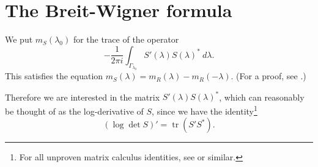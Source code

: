 \documentclass[12pt]{report}
\newcommand{\tr}{\operatorname{tr}}
\theoremstyle{definition}
\begin{document}
\section{The Breit-Wigner formula}
\label{BW section}
We put $m_S(\lambda_0)$ for the trace of the operator
$$-\frac{1}{2\pi i} \int_{\Gamma_{\lambda_0}} S'(\lambda)S(\lambda)^* ~d\lambda.$$
This satisfies the equation $m_S(\lambda) = m_R(\lambda) - m_R(-\lambda)$. (For a proof, see \cite[Theorem 2.14]{dyatlov2019mathematical}.)

Therefore we are interested in the matrix $S'(\lambda)S(\lambda)^*$, which can reasonably be thought of as the log-derivative of $S$, since we have the identity\footnote{For all unproven matrix calculus identities, see \cite{petersen2008matrix} or similar.}
\begin{equation}
\label{derivative of log det}
(\log \det S)' = \tr(S'S^*).
\end{equation}
\end{document}
